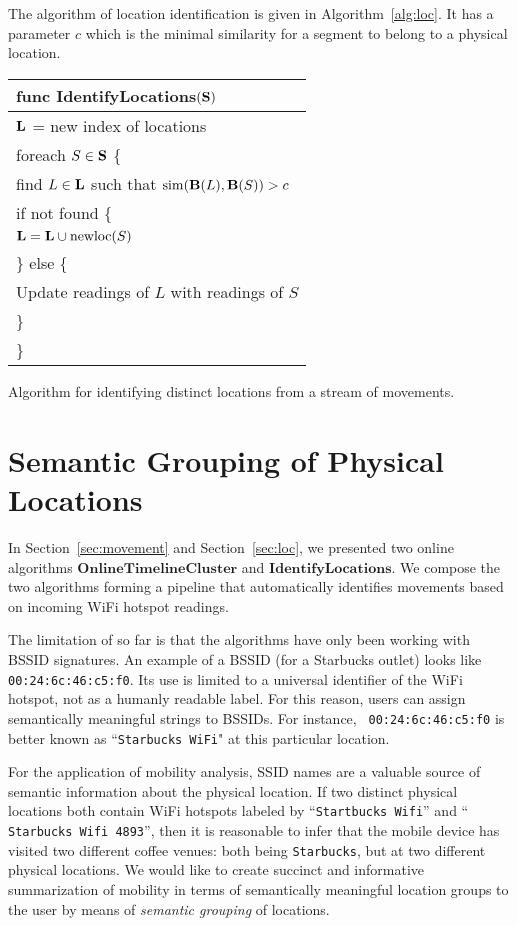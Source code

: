 The algorithm of location identification is given in Algorithm~\ref{alg:loc}.
It has a parameter $c$ which is the minimal similarity for a segment to belong
to a physical location.

\begin{algorithm}[h]
    \centering
\begin{tabular}{|l|} \hline
    func IdentifyLocations$(\mathbf{S})$ \\ \hline
    $\mathbf{L}$ = new index of locations \\
    foreach $S\in\mathbf{S}$ \{ \\
        \RRR find $L\in\mathbf{L}$ such that $\mathrm{sim}(\mathbf{B}(L), \mathbf{B}(S)) > c$ \\
        \RRR if not found \{ \\
        \RRR \RRR $\mathbf{L} = \mathbf{L}\cup \mathrm{newloc}(S)$ \\
        \RRR \} else \{ \\
        \RRR \RRR Update readings of $L$ with readings of $S$ \\
        \RRR \} \\
    \}\\ \hline
\end{tabular}
\vspace{0.4cm}
\caption{Algorithm for identifying distinct locations from a stream of
movements.}
\label{alg:loc}
\end{algorithm}

\section{Semantic Grouping of Physical Locations}

In Section~\ref{sec:movement} and Section~\ref{sec:loc}, we presented two online
algorithms $\mathbf{OnlineTimelineCluster}$ and $\mathbf{IdentifyLocations}$.
We compose the two algorithms forming a pipeline that automatically identifies
movements based on incoming WiFi hotspot readings.

The limitation of so far is that the algorithms have only been working with
BSSID signatures.  An example of a BSSID (for a Starbucks outlet) looks like 
{\tt 00:24:6c:46:c5:f0}.  Its use is limited to a universal identifier of the
WiFi hotspot, not as a humanly readable label.  For this reason, users can
assign semantically meaningful strings to BSSIDs.  For instance, {\tt
00:24:6c:46:c5:f0} is better known as ``{\tt Starbucks WiFi}" at this particular
location.

For the application of mobility analysis, SSID names are a valuable source of
semantic information about the physical location.  If two distinct physical
locations
both contain WiFi hotspots labeled by ``{\tt Startbucks Wifi}'' and ``{\tt
Starbucks Wifi 4893}'', then it is reasonable to infer that the mobile device
has visited two different coffee venues: both being {\tt Starbucks}, but at two
different physical locations.  
We would like to create succinct and informative
summarization of mobility in terms of semantically meaningful location groups to
the user by means of {\em semantic grouping} of locations.

